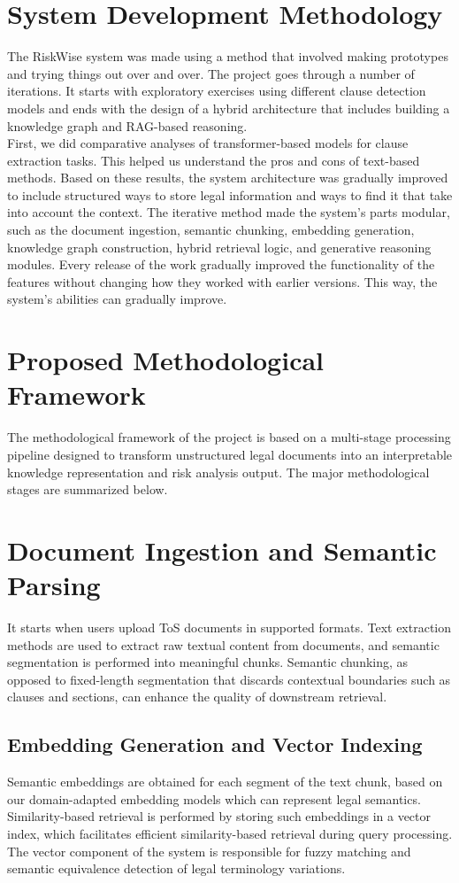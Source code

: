 \section{System Development Methodology}
The RiskWise system was made using a method that involved making
prototypes and trying things out over and over. The project goes
through a number of iterations. It starts with exploratory exercises
using different clause detection models and ends with the design of a
hybrid architecture that includes building a knowledge graph and
RAG-based reasoning.
\\
First, we did comparative analyses of transformer-based models for
clause extraction tasks. This helped us understand the pros and cons
of text-based methods. Based on these results, the system
architecture was gradually improved to include structured ways to
store legal information and ways to find it that take into account the context.
The iterative method made the system's parts modular, such as the
document ingestion, semantic chunking, embedding generation,
knowledge graph construction, hybrid retrieval logic, and generative
reasoning modules. Every release of the work gradually improved the
functionality of the features without changing how they worked with
earlier versions. This way, the system's abilities can gradually improve.

\section{Proposed Methodological Framework}
The methodological framework of the project is based on a multi-stage
processing pipeline designed to transform unstructured legal
documents into an interpretable knowledge representation and risk
analysis output. The major methodological stages are summarized below.

\section{Document Ingestion and Semantic Parsing}
It starts when users upload ToS documents in supported formats. Text
extraction methods are used to extract raw textual content from
documents, and semantic segmentation is performed into meaningful
chunks. Semantic chunking, as opposed to fixed-length segmentation
that discards contextual boundaries such as clauses and sections, can
enhance the quality of downstream retrieval.

\subsection{Embedding Generation and Vector Indexing}
Semantic embeddings are obtained for each segment of the text chunk,
based on our domain-adapted embedding models which can represent
legal semantics. Similarity-based retrieval is performed by storing
such embeddings in a vector index, which facilitates efficient
similarity-based retrieval during query processing. The vector
component of the system is responsible for fuzzy matching and
semantic equivalence detection of legal terminology variations.

